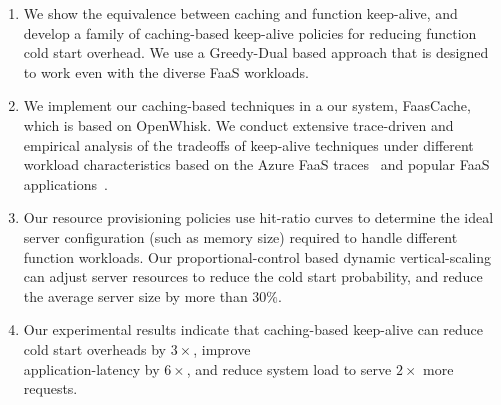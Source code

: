 \begin{enumerate}
\item We show the equivalence between caching and function keep-alive, and develop a family of caching-based keep-alive policies for reducing  function cold start overhead. We use a Greedy-Dual based approach that is designed to work even with the diverse FaaS workloads. 

\item We implement our caching-based techniques in a our system, FaasCache, which is based on OpenWhisk. 
  We conduct extensive trace-driven and empirical analysis of the tradeoffs of keep-alive techniques under different workload characteristics based on the Azure FaaS traces~\cite{shahrad_serverless_2020} and popular FaaS applications~\cite{kim_functionbench_2019}.
  
 
\item Our resource provisioning policies use hit-ratio curves to determine the ideal server configuration (such as memory size) required to handle different function workloads.
  Our proportional-control based dynamic vertical-scaling  can adjust server resources to reduce the cold start probability, and reduce the average server size by more than $30\%$. 

\item   Our experimental results indicate that caching-based keep-alive can reduce cold start overheads by $3\times$, 
  improve \\ application-latency by $6\times$,
  and reduce system load to serve $2\times$ more requests.
\end{enumerate}

%
%








